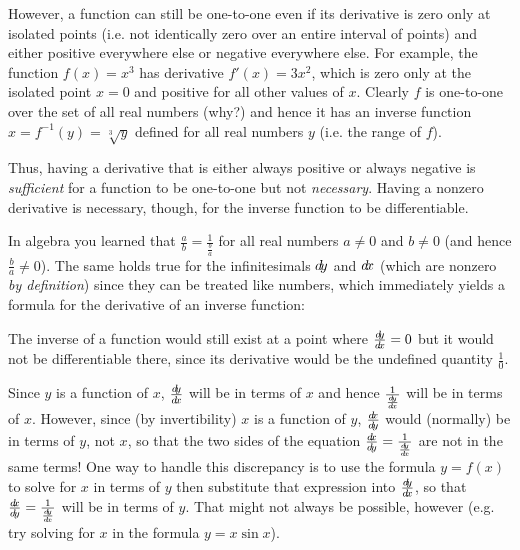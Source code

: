 However, a function can still be one-to-one even if
its derivative is zero only at isolated points (i.e. not identically zero over
an entire interval of points) and either positive everywhere else or negative
everywhere else. For example, the function $f(x) = x^3$ has derivative
$f'(x) = 3x^2$, which is zero only at the isolated point $x = 0$ and positive
for all other values of $x$. Clearly $f$ is one-to-one over the set of all real
numbers (why?) and hence it has an inverse function $x = f^{-1}(y) = \sqrt[3]{y}$
defined for all real numbers $y$ (i.e. the range of $f$).

Thus, having a derivative that is either
always positive or always negative is \emph{sufficient} for a function to be
one-to-one but not \emph{necessary}. Having a nonzero derivative is necessary,
though, for the inverse function to be differentiable.

In algebra you learned that $\frac{a}{b} = \frac{1}{\frac{b}{a}}$ for all real
numbers $a \ne 0$ and $b \ne 0$ (and hence $\frac{b}{a} \ne 0$). The same holds
true for the infinitesimals $d\!y$ and $d\!x$ (which are nonzero \emph{by definition}) since they
can be treated like numbers, which immediately yields a formula for the
derivative of an inverse function:

The inverse of a function would still exist at a point where $\frac{d\negmedspace y}{d\!x} = 0$
but it would not be differentiable there, since its derivative would be the
undefined quantity $\frac{1}{0}$.

Since $y$ is a function of $x$, $\frac{d\negmedspace y}{d\!x}$ will be in terms of $x$ and hence
$\frac{1}{\frac{d\negmedspace y}{d\!x}}$ will be in terms of $x$. However, since (by invertibility)
$x$ is a function of $y$, $\frac{d\negmedspace x}{d\!y}$ would (normally) be in terms of $y$, not $x$,
so that the two sides of the equation $\frac{d\negmedspace x}{d\!y} = \frac{1}{\frac{d\negmedspace y}{d\!x}}$ are not in the
same terms!
One way to handle this discrepancy is to use the formula $y = f(x)$ to solve for
$x$ in terms of $y$ then substitute that expression into $\frac{d\negmedspace y}{d\!x}$, so that
$\frac{d\negmedspace x}{d\!y} = \frac{1}{\frac{d\negmedspace y}{d\!x}}$ will be in terms of $y$. That might not always be
possible, however (e.g. try solving for $x$ in the formula $y = x \sin x$).

